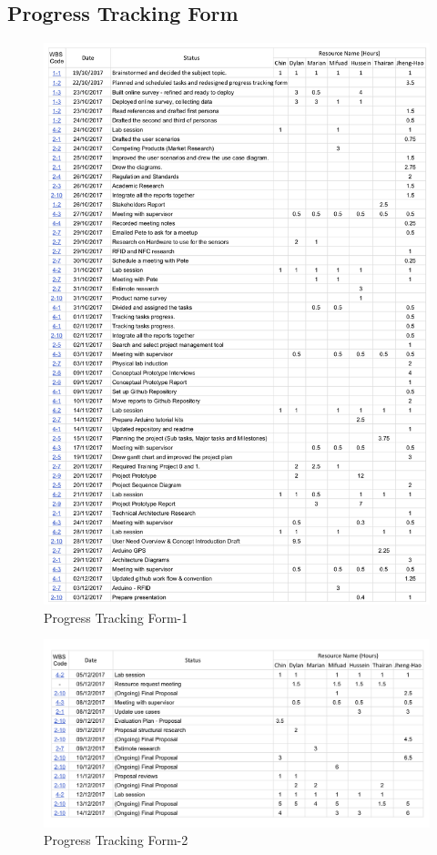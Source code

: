 \documentclass[12pt,a4paper]{article}
\begin{document}
\begin{appendices}
    \section{Progress Tracking Form}
      \label{appendix:progess-tracking-form}
      \begin{figure}[H]
        \centering
        \includegraphics[width=.9\textwidth]{../assets/12-9-3-progress-tracking-form-1.jpg}
        \caption{Progress Tracking Form-1}
        \label{fig:Progress Tracking Form-1}
      \end{figure}
      \begin{figure}[H]
        \centering
        \includegraphics[width=.9\textwidth]{../assets/12-9-3-progress-tracking-form-2.jpg}
        \caption{Progress Tracking Form-2}
        \label{fig:Progress Tracking Form-2}
      \end{figure}


\end{appendices}
\end{document}
